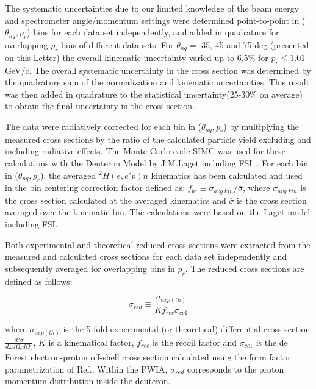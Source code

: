 The systematic uncertainties due to our limited knowledge of the beam energy and spectrometer angle/momentum settings were determined point-to-point in ($\theta_{nq}, p_{r}$) bins for each data set independently, and added in quadrature for overlapping $p_{r}$ bins
of different data sets. For $\theta_{nq}=$ 35, 45 and 75 deg (presented on this Letter) the overall kinematic uncertainty varied up to 6.5$\%$ for $p_{r}\leq1.01$ GeV/c.
The overall systematic uncertainty in the cross section was determined by the quadrature sum of the normalization and kinematic uncertainties. This result was then added in quadrature
to the statistical uncertainty(25-30$\%$ on average) to obtain the final uncertainty in the cross section.

The data were radiatively corrected for each bin in ($\theta_{nq}, p_{r}$) by multiplying the measured cross sections by the ratio of the calculated particle yield excluding and including radiative effects. The Monte-Carlo code SIMC was used for these calculations with the Deuteron Model by J.M.Laget including FSI~\cite{LAGET2005}.
For each bin in ($\theta_{nq}, p_{r}$), the averaged $^{2}H(e,e'p)n$ kinematics has been calculated and used in the bin centering correction factor defined as:
$f_{bc} \equiv \sigma_{avg.kin} / \bar{\sigma}$, where $\sigma_{avg.kin}$ is the cross section calculated at the averaged kinematics and $\bar{\sigma}$ is the cross section averaged over the kinematic bin. The calculations were based on the Laget model including FSI\cite{LAGET2005, PhysRevC.21.861}.

Both experimental and theoretical reduced cross sections were extracted from the measured and calculated cross sections for each data set independently and subsequently averaged for overlapping bins in $p_{r}$. The reduced cross sections are defined as follows:

\begin{equation}
\sigma_{red} \equiv \frac{\sigma_{exp(th)}}{Kf_{rec}\sigma_{cc1}}
\label{eq:1}
\end{equation}

where $\sigma_{exp(th)}$ is the 5-fold experimental (or theoretical) differential cross section $\frac{d^{5}\sigma}{d\omega d\Omega_{e} d\Omega_{p}}$, $K$ is a kinematical factor, $f_{rec}$ is the recoil factor  and $\sigma_{cc1}$ is the de Forest\cite{DEFOREST1983} electron-proton off-shell cross section calculated using the form factor parametrization of Ref.\cite{PhysRevC.69.022201}.
Within the PWIA, $\sigma_{red}$ corresponds to the proton momentum distribution inside the deuteron. 

